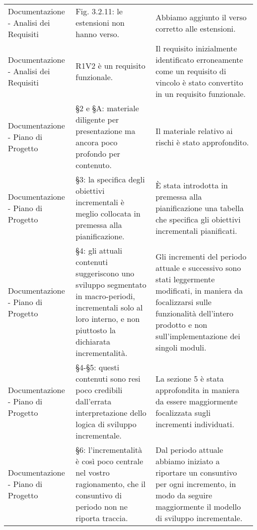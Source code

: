 \begin{longtable}{ 
				>{\centering}p{} 
				>{\centering}p{}
				>{\centering\arraybackslash}p{}}
				Documentazione - Analisi dei Requisiti
					&
				Fig. 3.2.11: le estensioni non hanno verso. 
					&
				Abbiamo aggiunto il verso corretto alle estensioni. 
					\\
					
				Documentazione - Analisi dei Requisiti
					&
				R1V2 è un requisito funzionale.
					&
				Il requisito inizialmente identificato erroneamente come un requisito di vincolo è stato convertito in un requisito funzionale. 
					\\
				
				Documentazione - Piano di Progetto
					&
				§2 e §A: materiale diligente per presentazione ma ancora poco profondo per contenuto. 
					&
				Il materiale relativo ai rischi è stato approfondito.
					\\
					
				Documentazione - Piano di Progetto
					&
				§3: la specifica degli obiettivi incrementali è meglio collocata in premessa alla pianificazione. 
					&
				È stata introdotta in premessa alla pianificazione una tabella che specifica gli obiettivi incrementali pianificati.
					\\
					
				Documentazione - Piano di Progetto
					&
				§4: gli attuali contenuti suggeriscono uno sviluppo segmentato in macro-periodi, incrementali solo al loro interno, e non piuttosto la dichiarata incrementalità. 
					&
				Gli incrementi del periodo attuale e successivo sono stati leggermente modificati, in maniera da focalizzarsi sulle funzionalità dell’intero prodotto\ped{\textit{G}} e non sull’implementazione dei singoli moduli\ped{\textit{G}}.
					\\
					
				Documentazione - Piano di Progetto
					&
				§4-§5: questi contenuti sono resi poco credibili dall’errata interpretazione dello logica di sviluppo incrementale. 
					&
				La sezione 5 è stata approfondita in maniera da essere maggiormente focalizzata sugli incrementi individuati.
					\\
					
				Documentazione - Piano di Progetto
					&
				§6: l’incrementalità è così poco centrale nel vostro ragionamento, che il consuntivo di periodo non ne riporta traccia. 
					&
				Dal periodo attuale abbiamo iniziato a riportare un consuntivo per ogni incremento, in modo da seguire maggiormente il modello di sviluppo incrementale.
					\\
					

\end{longtable}
